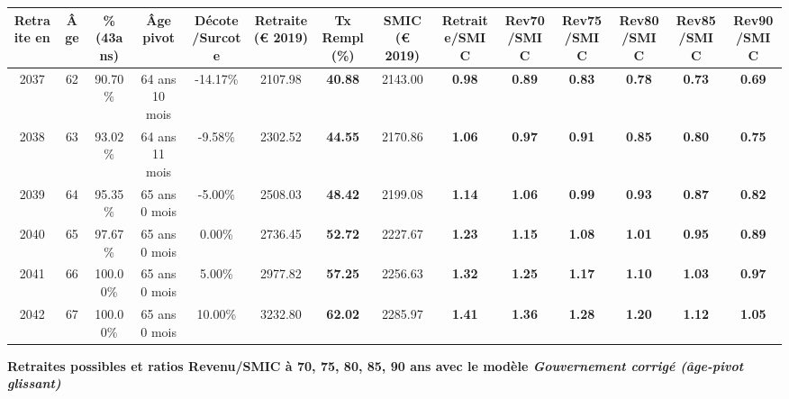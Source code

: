 \begin{adjustbox}{max width=\textwidth} 
\begin{tabular}[htb]{|c|c||c|c|c||c|c||c||c|c|c|c|c|c|} 
\hline 
 Retraite en &  Âge &  \%(43ans) &  Âge pivot &  Décote/Surcote &  Retraite (\euro{} 2019) &  Tx Rempl(\%) &  SMIC (\euro{} 2019) &  Retraite/SMIC &  Rev70/SMIC &  Rev75/SMIC &  Rev80/SMIC &  Rev85/SMIC &  Rev90/SMIC \\ 
\hline \hline 
 2037 &  62 &  90.70\% &  64 ans 10 mois &  -14.17\% &  2107.98 &  {\bf 40.88} &  2143.00 &  {\bf {\color{red} 0.98}} &  {\bf {\color{red} 0.89}} &  {\bf {\color{red} 0.83}} &  {\bf {\color{red} 0.78}} &  {\bf {\color{red} 0.73}} &  {\bf {\color{red} 0.69}} \\ 
\hline 
 2038 &  63 &  93.02\% &  64 ans 11 mois &  -9.58\% &  2302.52 &  {\bf 44.55} &  2170.86 &  {\bf 1.06} &  {\bf {\color{red} 0.97}} &  {\bf {\color{red} 0.91}} &  {\bf {\color{red} 0.85}} &  {\bf {\color{red} 0.80}} &  {\bf {\color{red} 0.75}} \\ 
\hline 
 2039 &  64 &  95.35\% &  65 ans 0 mois &  -5.00\% &  2508.03 &  {\bf 48.42} &  2199.08 &  {\bf 1.14} &  {\bf 1.06} &  {\bf {\color{red} 0.99}} &  {\bf {\color{red} 0.93}} &  {\bf {\color{red} 0.87}} &  {\bf {\color{red} 0.82}} \\ 
\hline 
 2040 &  65 &  97.67\% &  65 ans 0 mois &  0.00\% &  2736.45 &  {\bf 52.72} &  2227.67 &  {\bf 1.23} &  {\bf 1.15} &  {\bf 1.08} &  {\bf 1.01} &  {\bf {\color{red} 0.95}} &  {\bf {\color{red} 0.89}} \\ 
\hline 
 2041 &  66 &  100.00\% &  65 ans 0 mois &  5.00\% &  2977.82 &  {\bf 57.25} &  2256.63 &  {\bf 1.32} &  {\bf 1.25} &  {\bf 1.17} &  {\bf 1.10} &  {\bf 1.03} &  {\bf {\color{red} 0.97}} \\ 
\hline 
 2042 &  67 &  100.00\% &  65 ans 0 mois &  10.00\% &  3232.80 &  {\bf 62.02} &  2285.97 &  {\bf 1.41} &  {\bf 1.36} &  {\bf 1.28} &  {\bf 1.20} &  {\bf 1.12} &  {\bf 1.05} \\ 
\hline 
\hline 
\end{tabular} 
\end{adjustbox} 
 
 \vspace{0.1cm} 
{\bf \noindent Retraites possibles et ratios Revenu/SMIC à 70, 75, 80, 85, 90 ans avec le modèle \emph{Gouvernement corrigé (âge-pivot glissant)}}  
 
